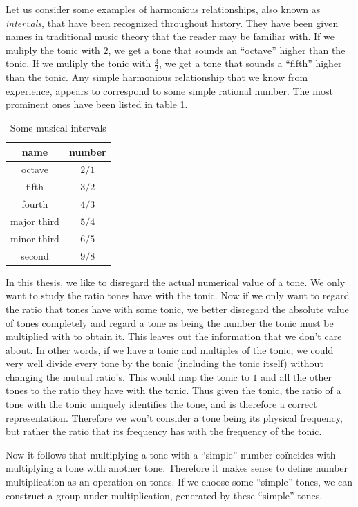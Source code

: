 \documentclass[a4paper]{book}
\theoremstyle{definition}
\begin{document}
Let us consider some examples of harmonious relationships, also known as \emph{intervals}, that have been recognized throughout history.
They have been given names in traditional music theory that the reader may be familiar with.
If we muliply the tonic with $2$, we get a tone that sounds an ``octave'' higher than the tonic.
If we muliply the tonic with $\frac{3}{2}$, we get a tone that sounds a ``fifth'' higher than the tonic.
Any simple harmonious relationship that we know from experience, appears to correspond to some simple rational number.
The most prominent ones have been listed in table \ref{musical_intervals}.

\begin{table}[h]
    \centering
    \begin{tabular}{|c|c|}
        \hline
        name & number \\ \hline
        octave & $2/1$ \\ 
        fifth & $3/2$ \\ 
        fourth & $4/3$ \\ 
        major third & $5/4$ \\ 
        minor third & $6/5$ \\ 
        second & $9/8$ \\ 
        \hline
    \end{tabular}
    \caption{Some musical intervals}
    \label{musical_intervals}
\end{table}

In this thesis, we like to disregard the actual numerical value of a tone.
We only want to study the ratio tones have with the tonic.
Now if we only want to regard the ratio that tones have with some tonic, we better disregard the absolute value of tones completely and regard a tone as being the number the tonic must be multiplied with to obtain it.
This leaves out the information that we don't care about.
In other words, if we have a tonic and multiples of the tonic, we could very well divide every tone by the tonic (including the tonic itself) without changing the mutual ratio's.
This would map the tonic to $1$ and all the other tones to the ratio they have with the tonic.
Thus given the tonic, the ratio of a tone with the tonic uniquely identifies the tone, and is therefore a correct representation.
Therefore we won't consider a tone being its physical frequency, but rather the ratio that its frequency has with the frequency of the tonic.

Now it follows that multiplying a tone with a ``simple'' number co\"incides with multiplying a tone with another tone.
Therefore it makes sense to define number multiplication as an operation on tones.
If we choose some ``simple'' tones, we can construct a group under multiplication, generated by these ``simple'' tones.
\end{document}

